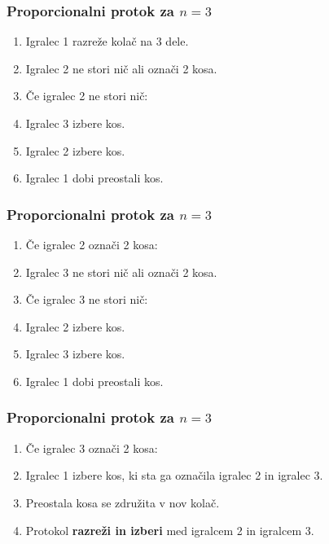 \documentclass{beamer}
\begin{document}
	\begin{frame}
		\frametitle{Proporcionalni protok za $n = 3$}
		\begin{enumerate}
			\item Igralec 1 razreže kolač na 3 dele.
			
			\item Igralec 2 ne stori nič ali označi 2 kosa.
			
			\item[] Če igralec 2 ne stori nič:
			
			\setcounter{enumi}{2}
			
			\item \qquad Igralec 3 izbere kos.
			
			\item \qquad Igralec 2 izbere kos.
			
			\item \qquad Igralec 1 dobi preostali kos.
		\end{enumerate}
	\end{frame}

	\begin{frame}
		\frametitle{Proporcionalni protok za $n = 3$}
		\begin{enumerate}
			\item[] Če igralec 2 označi 2 kosa:
			
			\setcounter{enumi}{2}
			
			\item \qquad Igralec 3 ne stori nič ali označi 2 kosa.
			
			\item[] \qquad Če igralec 3 ne stori nič:
			
			\setcounter{enumi}{3}
			
			\item \qquad \qquad Igralec 2 izbere kos.
					
			\setcounter{enumi}{4}
			
			\item \qquad \qquad Igralec 3 izbere kos.
			
			\item \qquad \qquad Igralec 1 dobi preostali kos.
		\end{enumerate}
	\end{frame}
	
	\begin{frame}
	\frametitle{Proporcionalni protok za $n = 3$}
		\begin{enumerate}
			
			\item[] \qquad Če igralec 3 označi 2 kosa:
			
			\setcounter{enumi}{3}
			
			\item \qquad \qquad Igralec 1 izbere kos, ki sta ga označila igralec 2 in igralec 3.
			
			\item \qquad \qquad Preostala kosa se združita v nov kolač.
			
			\item \qquad \qquad Protokol \textbf{razreži in izberi} med igralcem 2 in igralcem 3.
		\end{enumerate}
	\end{frame}
\end{document}
